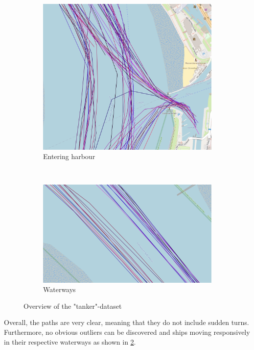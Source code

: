 \begin{figure}[H]
\begin{minipage}{.45\linewidth}
\begin{subfigure}[t]{.9\linewidth}
            \includegraphics[width=\textwidth]{images/ais/tracks/tanker_partial.png}
            \caption{Entering harbour}
            \label{fig:tankerEntering}
        \end{subfigure} \\
        \begin{subfigure}[b]{.9\linewidth}
            \includegraphics[width=\textwidth]{images/ais/tracks/tanker_fahrrinnen.png}
            \caption{Waterways}
            \label{fig:tankerWaterway}
        \end{subfigure} 
    \end{minipage}
    \caption{Overview of the "tanker"-dataset}
    \label{fig:tankerTracks}
\end{figure}
Overall, the paths are very clear, meaning that they do not include sudden turns. Furthermore, no obvious outliers can be discovered and ships moving responsively in their respective waterways as shown in \ref{fig:tankerWaterway}.


